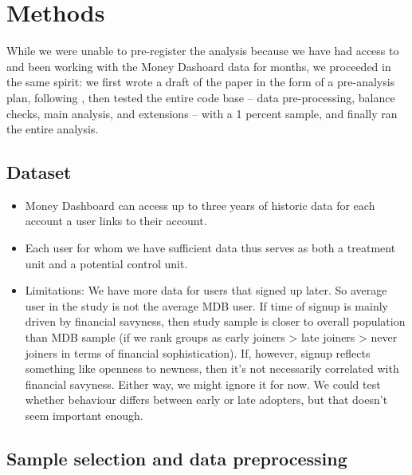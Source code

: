 
\section{Methods}%
\label{sec:data}

While we were unable to pre-register the analysis because we have had access to
and been working with the Money Dashoard data for months, we proceeded in the
same spirit: we first wrote a draft of the paper in the form of a pre-analysis
plan, following \citet{olken2015promises}, then tested the entire code base --
data pre-processing, balance checks, main analysis, and extensions -- with a 1
percent sample, and finally ran the entire analysis.


\subsection{Dataset}%
\label{sub:dataset}

\begin{itemize}

    \item Money Dashboard can access up to three years of historic data for
        each account a user links to their account.

    \item Each user for whom we have sufficient data thus serves as both a
        treatment unit and a potential control unit.

    \item Limitations: We have more data for users that signed up later. So average user in
        the study is not the average MDB user. If time of signup is mainly
        driven by financial savyness, then study sample is closer to overall
        population than MDB sample (if we rank groups as early joiners > late
        joiners > never joiners in terms of financial sophistication). If,
        however, signup reflects something like openness to newness, then it's
        not necessarily correlated with financial savyness. Either way, we
        might ignore it for now. We could test whether behaviour differs
        between early or late adopters, but that doesn't seem important enough.

\end{itemize}


\subsection{Sample selection and data preprocessing}%
\label{sub:sample_selection}

